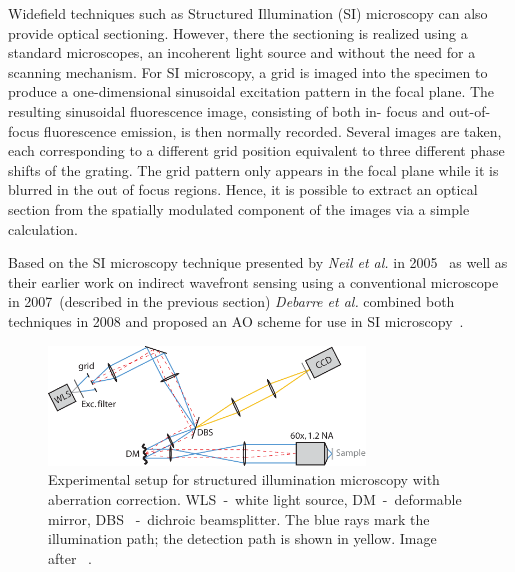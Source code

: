Widefield techniques such as Structured Illumination (SI) microscopy can also provide optical sectioning. However, there the sectioning is realized using a standard microscopes, an incoherent light source and without the need for a scanning mechanism. For SI microscopy, a grid is imaged into the specimen to produce a one-dimensional sinusoidal excitation pattern in the focal plane. The resulting sinusoidal fluorescence image, consisting of both in- focus and out-of-focus fluorescence emission, is then normally recorded. Several images are taken, each corresponding to a different grid position equivalent to three different phase shifts of the grating. The grid pattern only appears in the focal plane while it is blurred in the out of focus regions. Hence, it is possible to extract an optical section from the spatially modulated component of the images via a simple calculation.

Based on the SI microscopy technique presented by \emph{Neil et al.} in 2005~\cite{wide_structured_illu_principle} as well as their earlier work on indirect wavefront sensing using a conventional microscope~\cite{wide_AOM_loew_freq} in 2007~(described in the previous section) \emph{Debarre et al.} combined both techniques in 2008 and proposed an AO scheme for use in SI microscopy~\cite{wide_AOM_structured_illu}.  

\begin{figure}
	\centering
		\includegraphics[width=0.75\textwidth]{images/wide_structured_illumination.pdf}
	\caption{Experimental setup for structured illumination microscopy with 
aberration correction. WLS~-~white light source, DM~-~deformable mirror, DBS
~-~dichroic beamsplitter. The blue rays mark the illumination path; the 
detection path is shown in yellow. Image after~\cite{wide_AOM_structured_illu}
.}
	\label{fig:wide_structured_illumination}
\end{figure}

